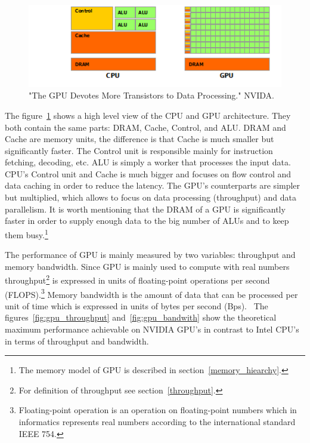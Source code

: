 \documentclass[12pt,oneside]{fithesis2}
\begin{document}
\begin{figure}[H]
	\centering
	\includegraphics{figures/gpu-devotes-more-transistors-to-data-processing.png}
	\caption{"The GPU Devotes More Transistors to Data Processing." NVIDA. \cite{cuda_guide}}
	\label{fig:cpu_vs_gpu_arch}
\end{figure}

The figure~\ref{fig:cpu_vs_gpu_arch} shows a high level view of the CPU and GPU architecture. They both contain the same parts: DRAM, Cache, Control, and ALU. DRAM and Cache are memory units, the difference is that Cache is much smaller but significantly faster. The Control unit is responsible mainly for instruction fetching, decoding, etc. ALU is simply a worker that processes the input data. CPU's Control unit and Cache is much bigger and focuses on flow control and data caching in order to reduce the latency. The GPU's counterparts are simpler but multiplied, which allows to focus on data processing (throughput) and data parallelism. It is worth mentioning that the DRAM of a GPU is significantly faster in order to supply enough data to the big number of ALUs and to keep them busy.\footnote{The memory model of GPU is described in section~\ref{memory_hiearchy}.}

The performance of GPU is mainly measured by two variables: throughput and memory bandwidth. Since GPU is mainly used to compute with real numbers throughput\footnote{For definition of throughput see section~\ref{throughput}.} is expressed in units of floating-point operations per second (FLOPS).\footnote{Floating-point operation is an operation on floating-point numbers which in informatics represents real numbers according to the international standard IEEE 754.} Memory bandwidth is the amount of data that can be processed per unit of time which is expressed in units of bytes per second (Bps).~\cite{professional_cuda} The figures~\ref{fig:gpu_throughput} and~\ref{fig:gpu_bandwith} show the theoretical maximum performance achievable on NVIDIA GPU's in contrast to Intel CPU's in terms of throughput and bandwidth.
\end{document}
